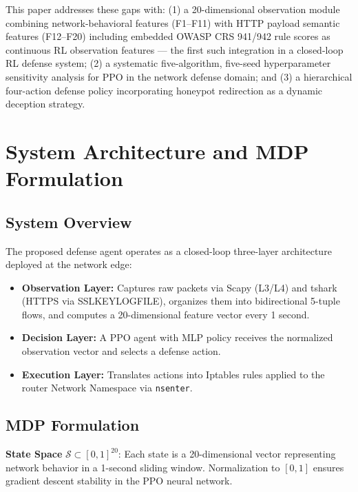 \documentclass[conference]{IEEEtran}
\begin{document}
This paper addresses these gaps with: (1) a 20-dimensional observation
module combining network-behavioral features (F1--F11) with HTTP payload
semantic features (F12--F20) including embedded OWASP CRS 941/942 rule
scores as continuous RL observation features --- the first such integration
in a closed-loop RL defense system; (2) a systematic five-algorithm,
five-seed hyperparameter sensitivity analysis for PPO in the network defense
domain; and (3) a hierarchical four-action defense policy incorporating
honeypot redirection as a dynamic deception strategy.

\section{System Architecture and MDP Formulation}

\subsection{System Overview}
The proposed defense agent operates as a closed-loop three-layer architecture
deployed at the network edge:
\begin{itemize}
  \item \textbf{Observation Layer:} Captures raw packets via Scapy (L3/L4)
    and tshark (HTTPS via SSLKEYLOGFILE), organizes them into bidirectional
    5-tuple flows, and computes a 20-dimensional feature vector every 1
    second.
  \item \textbf{Decision Layer:} A PPO agent with MLP policy receives the
    normalized observation vector and selects a defense action.
  \item \textbf{Execution Layer:} Translates actions into Iptables rules
    applied to the router Network Namespace via \texttt{nsenter}.
\end{itemize}

\subsection{MDP Formulation}

\textbf{State Space} $\mathcal{S} \subset [0,1]^{20}$: Each state is a
20-dimensional vector representing network behavior in a 1-second sliding
window. Normalization to $[0,1]$ ensures gradient descent stability in the
PPO neural network.
\end{document}
